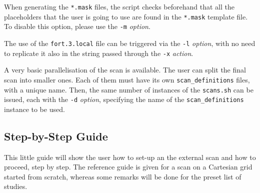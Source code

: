 When generating the \texttt{*.mask} files,
the script checks beforehand that all the placeholders that the
user is going to use are found in the \texttt{*.mask} template
file. To disable this option, please use the \texttt{-m} \emph{option}.

The use of the \texttt{fort.3.local} file can be triggered via
the \texttt{-l} \emph{option}, with no need to replicate it also in
the string passed through the \texttt{-x} \emph{action}.

A very basic parallelisation of the scan is available. The user can
split the final scan into smaller ones. Each of them must have
its own \texttt{scan\_definitions} files, with a unique name. Then,
the same number of instances of the \texttt{scans.sh} can be issued,
each with the \texttt{-d} \emph{option}, specifying the name
of the \texttt{scan\_definitions} instance to be used.

\subsection{Step-by-Step Guide}
This little guide will show the user how to set-up an the external
scan and how to proceed, step by step. The reference guide is given
for a scan on a Cartesian grid started from scratch, whereas some
remarks will be done for the preset list of studies.

